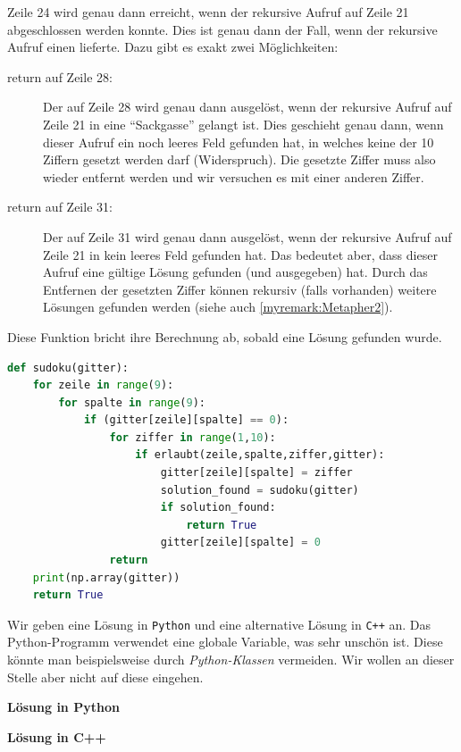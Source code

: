 \begin{myanswer}[myexercise:0681]
	Zeile 24 wird genau dann erreicht, wenn der rekursive Aufruf auf Zeile 21 abgeschlossen werden konnte. Dies ist genau dann der Fall, wenn der rekursive Aufruf einen  lieferte. Dazu gibt es exakt zwei Möglichkeiten:
	\begin{description}
		\item[return auf Zeile 28:] Der  auf Zeile 28 wird genau dann ausgelöst, wenn der rekursive Aufruf auf Zeile 21 in eine \enquote{Sackgasse} gelangt ist. Dies geschieht genau dann, wenn dieser Aufruf ein noch leeres Feld gefunden hat, in welches keine der 10 Ziffern gesetzt werden darf (Widerspruch). Die gesetzte Ziffer muss also wieder entfernt werden und wir versuchen es mit einer anderen Ziffer.
		\item[return auf Zeile 31:] Der  auf Zeile 31 wird genau dann ausgelöst, wenn der rekursive Aufruf auf Zeile 21 in kein leeres Feld gefunden hat. Das bedeutet aber, dass dieser Aufruf eine gültige Lösung gefunden (und ausgegeben) hat. Durch das Entfernen der gesetzten Ziffer können rekursiv (falls vorhanden) weitere Lösungen gefunden werden (siehe auch \cref{myremark:Metapher2}).
	\end{description}
\end{myanswer}

\begin{myanswer}[myexercise:0603]
	Diese Funktion bricht ihre Berechnung ab, sobald eine Lösung gefunden wurde.
	\begin{lstlisting}[language=Python,caption=Implementation der Funktion \pythoninline{sudoku},label=listing:sudokuUnique]
def sudoku(gitter):
	for zeile in range(9):
		for spalte in range(9):
			if (gitter[zeile][spalte] == 0):
				for ziffer in range(1,10):
					if erlaubt(zeile,spalte,ziffer,gitter):
						gitter[zeile][spalte] = ziffer
						solution_found = sudoku(gitter)
						if solution_found:
							return True
						gitter[zeile][spalte] = 0
				return
	print(np.array(gitter))
	return True
\end{lstlisting}
\end{myanswer}

\begin{myanswer}[myexercise:0604]
	\lstset{basicstyle=\ttfamily\footnotesize}
	Wir geben eine Lösung in \verb|Python| und eine alternative Lösung in \verb|C++| an. Das Python-Programm verwendet eine globale Variable, was sehr unschön ist. Diese könnte man beispielsweise durch \textit{Python-Klassen} vermeiden. Wir wollen an dieser Stelle aber nicht auf diese eingehen.
	\vspace{1cm}

	\textbf{Lösung in Python}
	

	\textbf{Lösung in C++}
	
	
	
\end{myanswer}

\lstset{style=BaselineStyle}


\clearpage
\shipoutAnswer
